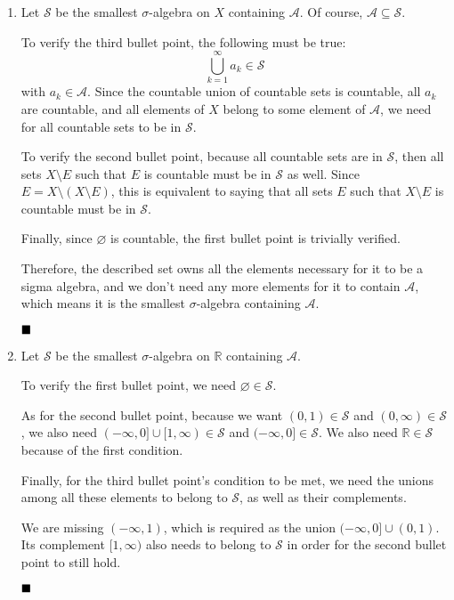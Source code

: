 \documentclass[11pt, a4paper, tikz]{article}
\renewcommand{\qed}{\hfill\blacksquare}
\newcommand{\reals}{
	\ensuremath{\mathbb{R}}
}
\newcommand{\sigmaAlgebra}[1]{
	\ensuremath{\mathcal{#1}}
}
\begin{document}
	\begin{enumerate}[label=\alph*)]
		\item Let $\sigmaAlgebra{S}$ be the smallest $\sigma$-algebra on $X$ containing $\mathcal{A}$. Of course, $\mathcal{A}\subseteq\sigmaAlgebra{S}$.
		
		To verify the third bullet point, the following must be true: \[\bigcup_{k=1}^{\infty}a_k\in\sigmaAlgebra{S}\] with $a_k\in\mathcal{A}$. Since the countable union of countable sets is countable, all $a_k$ are countable, and all elements of $X$ belong to some element of $\mathcal{A}$, we need for all countable sets to be in $\sigmaAlgebra{S}$.
		
		To verify the second bullet point, because all countable sets are in $\sigmaAlgebra{S}$, then all sets $X\setminus E$ such that $E$ is countable must be in $\sigmaAlgebra{S}$ as well. Since $E = X\setminus(X\setminus E)$, this is equivalent to saying that all sets $E$ such that $X\setminus E$ is countable must be in $\sigmaAlgebra{S}$.
		
		Finally, since $\varnothing$ is countable, the first bullet point is trivially verified.
		
		Therefore, the described set owns all the elements necessary for it to be a sigma algebra, and we don't need any more elements for it to contain $\mathcal{A}$, which means it is the smallest $\sigma$-algebra containing $\mathcal{A}$.
		
		$\qed$
		
		\item Let $\sigmaAlgebra{S}$ be the smallest $\sigma$-algebra on $\reals$ containing $\mathcal{A}$.
		
		To verify the first bullet point, we need $\varnothing\in\sigmaAlgebra{S}$.
		
		As for the second bullet point, because we want $(0,1)\in\sigmaAlgebra{S}$ and $(0,\infty)\in\sigmaAlgebra{S}$, we also need $(-\infty,0]\cup[1,\infty)\in\sigmaAlgebra{S}$ and $(-\infty,0]\in\sigmaAlgebra{S}$. We also need $\reals\in\sigmaAlgebra{S}$ because of the first condition.
		
		Finally, for the third bullet point's condition to be met, we need the unions among all these elements to belong to $\sigmaAlgebra{S}$, as well as their complements.
		
		We are missing $(-\infty, 1)$, which is required as the union $(-\infty,0]\cup(0,1)$. Its complement $[1,\infty)$ also needs to belong to $\sigmaAlgebra{S}$ in order for the second bullet point to still hold.
		
		$\qed$
	\end{enumerate}
\end{document}
